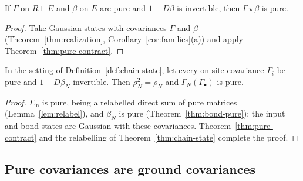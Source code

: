 \begin{corollary}\label{cor:cov-pure}
If $\Gamma$ on $R\sqcup E$ and $\beta$ on $E$ are pure and $1-D\beta$ is invertible, then
$\Gamma\star\beta$ is pure.
\end{corollary}
\begin{proof}
Take Gaussian states with covariances $\Gamma$ and $\beta$ (Theorem~\ref{thm:realization},
Corollary~\ref{cor:families}(a)) and apply Theorem~\ref{thm:pure-contract}.
\end{proof}

\begin{corollary}\label{cor:chain-pure}
In the setting of Definition~\ref{def:chain-state}, let every on-site covariance $\Gamma_i$ be
pure and $1-D\beta_N$ invertible. Then $\rho_N^2=\rho_N$ and $\Gamma_N(\Gamma_\bullet)$ is pure.
\end{corollary}
\begin{proof}
$\Gamma_{\mathrm{in}}$ is pure, being a relabelled direct sum of pure matrices
(Lemma~\ref{lem:relabel}), and $\beta_N$ is pure (Theorem~\ref{thm:bond-pure}); the input and
bond states are Gaussian with these covariances. Theorem~\ref{thm:pure-contract} and the
relabelling of Theorem~\ref{thm:chain-state} complete the proof.
\end{proof}

\subsection{Pure covariances are ground covariances}
\label{sec:pure-ground}


